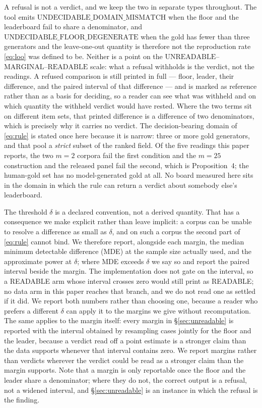 \documentclass{article}
\begin{document}
A refusal is not a verdict, and we keep the two in separate types throughout. The tool emits $\mathrm{UNDECIDABLE\_DOMAIN\_MISMATCH}$ when the floor and the leaderboard fail to share a denominator, and $\mathrm{UNDECIDABLE\_FLOOR\_DEGENERATE}$ when the gold has fewer than three generators and the leave-one-out quantity is therefore not the reproduction rate \eqref{eq:loo} was defined to be. Neither is a point on the $\mathrm{UNREADABLE}$--$\mathrm{MARGINAL}$--$\mathrm{READABLE}$ scale: what a refusal withholds is the verdict, not the readings. A refused comparison is still printed in full --- floor, leader, their difference, and the paired interval of that difference --- and is marked as reference rather than as a basis for deciding, so a reader can see what was withheld and on which quantity the withheld verdict would have rested. Where the two terms sit on different item sets, that printed difference is a difference of two denominators, which is precisely why it carries no verdict. The decision-bearing domain of \eqref{eq:rule} is stated once here because it is narrow: three or more gold generators, and that pool a \emph{strict} subset of the ranked field. Of the five readings this paper reports, the two $m=2$ corpora fail the first condition and the $m=25$ construction and the released panel fail the second, which is Proposition~4; the human-gold set has no model-generated gold at all. No board measured here sits in the domain in which the rule can return a verdict about somebody else's leaderboard.

The threshold $\delta$ is a declared convention, not a derived quantity. That has a consequence we make explicit rather than leave implicit: a corpus can be unable to resolve a difference as small as $\delta$, and on such a corpus the second part of \eqref{eq:rule} cannot bind. We therefore report, alongside each margin, the median minimum detectable difference (MDE) at the sample size actually used, and the approximate power at $\delta$; where MDE exceeds $\delta$ we say so and report the paired interval beside the margin. The implementation does not gate on the interval, so a READABLE arm whose interval crosses zero would still print as READABLE; no data arm in this paper reaches that branch, and we do not read one as settled if it did. We report both numbers rather than choosing one, because a reader who prefers a different $\delta$ can apply it to the margins we give without recomputation. The same applies to the margin itself: every margin in \S\ref{sec:unreadable} is reported with the interval obtained by resampling cases jointly for the floor and the leader, because a verdict read off a point estimate is a stronger claim than the data supports whenever that interval contains zero. We report margins rather than verdicts wherever the verdict could be read as a stronger claim than the margin supports. Note that a margin is only reportable once the floor and the leader share a denominator; where they do not, the correct output is a refusal, not a widened interval, and \S\ref{sec:unreadable} is an instance in which the refusal is the finding.
\end{document}

